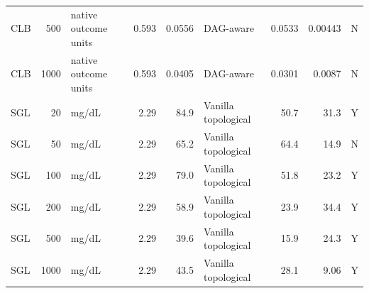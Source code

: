 \begin{tabular}{lrlrrlrrc}
CLB & 500 & native outcome units & 0.593 & 0.0556 & DAG-aware & 0.0533 & 0.00443 & N \\
CLB & 1000 & native outcome units & 0.593 & 0.0405 & DAG-aware & 0.0301 & 0.0087 & N \\
SGL & 20 & mg/dL & 2.29 & 84.9 & Vanilla topological & 50.7 & 31.3 & Y \\
SGL & 50 & mg/dL & 2.29 & 65.2 & Vanilla topological & 64.4 & 14.9 & N \\
SGL & 100 & mg/dL & 2.29 & 79.0 & Vanilla topological & 51.8 & 23.2 & Y \\
SGL & 200 & mg/dL & 2.29 & 58.9 & Vanilla topological & 23.9 & 34.4 & Y \\
SGL & 500 & mg/dL & 2.29 & 39.6 & Vanilla topological & 15.9 & 24.3 & Y \\
SGL & 1000 & mg/dL & 2.29 & 43.5 & Vanilla topological & 28.1 & 9.06 & Y \\
\bottomrule
\end{tabular}
